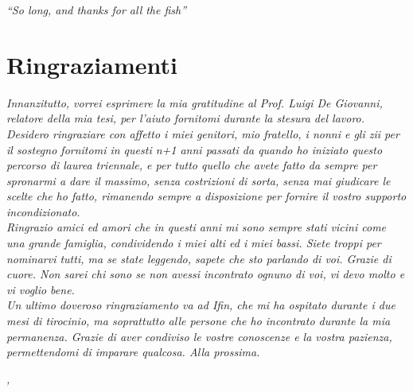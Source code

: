 
\cleardoublepage
{}
{}

\begin{flushright}{
	\slshape    
	``So long, and thanks for all the fish''} \\ 
\end{flushright}


\bigskip

\begingroup
\let\clearpage\relax
\let\cleardoublepage\relax
\let\cleardoublepage\relax

\chapter*{Ringraziamenti}

\noindent \textit{Innanzitutto, vorrei esprimere la mia gratitudine al Prof. Luigi De Giovanni, relatore della mia tesi, per l'aiuto fornitomi durante la stesura del lavoro.}\\

\noindent \textit{Desidero ringraziare con affetto i miei genitori, mio fratello, i nonni e gli zii per il sostegno fornitomi in questi n+1 anni passati da quando ho iniziato questo percorso di laurea triennale, e per tutto quello che avete fatto da sempre per spronarmi a dare il massimo, senza costrizioni di sorta, senza mai giudicare le scelte che ho fatto, rimanendo sempre a disposizione per fornire il vostro supporto incondizionato.}\\

\noindent \textit{Ringrazio amici ed amori che in questi anni mi sono sempre stati vicini come una grande famiglia, condividendo i miei alti ed i miei bassi. Siete troppi per nominarvi tutti, ma se state leggendo, sapete che sto parlando di voi. Grazie di cuore. Non sarei chi sono se non avessi incontrato ognuno di voi, vi devo molto e vi voglio bene.}\\

\noindent \textit{Un ultimo doveroso ringraziamento va ad Ifin, che mi ha ospitato durante i due mesi di tirocinio, ma soprattutto alle persone che ho incontrato durante la mia permanenza. Grazie di aver condiviso le vostre conoscenze e la vostra pazienza, permettendomi di imparare qualcosa. Alla prossima.}\\
\bigskip

\noindent\textit{\myLocation, \myTime}
\hfill \myName

\endgroup

